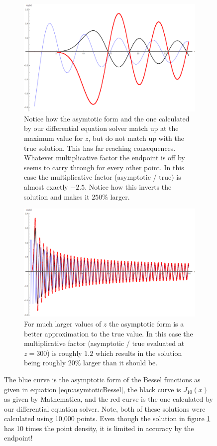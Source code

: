 \documentclass[onecolumn, groupedaddress, 10pt]{revtex4-1}
\begin{document}
\begin{figure}[H]
	\centering
	\begin{subfigure}{.5\textwidth}
  		\centering
  		\includegraphics[width=.9\linewidth]{BesselBadBoundary.png}
  		\caption{\label{fig:BesselBadBoundary} Notice how the asymtotic form and the one calculated by our differential equation solver match up at the maximum value for $z$, but do not match up with the true solution.  This has far reaching consequences.  Whatever multiplicative factor the endpoint is off by seems to carry through for every other point.  In this case the multiplicative factor (asymptotic / true) is almost exactly $-2.5$.  Notice how this inverts the solution and makes it $250\%$ larger.}
	\end{subfigure}%
	\begin{subfigure}{.5\textwidth}
  		\centering
  		\includegraphics[width=.9\linewidth]{BesselGoodBoundary.png}
  		\caption{\label{fig:BesselGoodBoundary} For much larger values of $z$ the asymptotic form is a better approximation to the true value.  In this case the multiplicative factor (asymptotic / true evaluated at $z=300$) is roughly $1.2$ which results in the solution being roughly $20\%$ larger than it should be.}
	\end{subfigure}
	\caption{The blue curve is the asymptotic form of the Bessel functions as given in equation \ref{eqn:asymtoticBessel}, the black curve is $J_{10} (x)$ as given by Mathematica, and the red curve is the one calculated by our differential equation solver.  Note, both of these solutions were calculated using 10,000 points.  Even though the solution in figure \ref{fig:BesselBadBoundary} has 10 times the point density, it is limited in accuracy by the endpoint!}
\end{figure}
\end{document}
